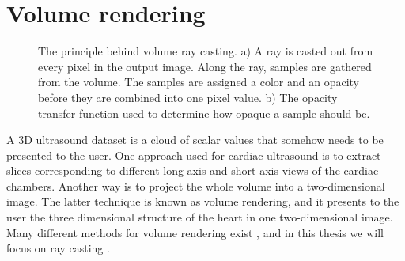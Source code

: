 \section{Volume rendering}\label{sec:volren}
\begin{figure}[t!]
\centering
{}
\caption{The principle behind volume ray casting. a) A ray is casted out from every pixel in the output image. Along the ray, samples are gathered from the volume. The samples are assigned a color and an opacity before they are combined into one pixel value. b) The opacity transfer function used to determine how opaque a sample should be.}
\label{fig:vr}
\end{figure}
A 3D ultrasound dataset is a cloud of scalar values that somehow needs to be presented to the user. One approach used for cardiac ultrasound  is to extract slices corresponding to different long-axis and short-axis views of the cardiac chambers. Another way is to project the whole volume into a two-dimensional image. The latter technique is known as volume rendering, and it presents to the user the three dimensional structure of the heart in one two-dimensional image. Many different methods for volume rendering exist \cite{brodlie2001}, and in this thesis we will focus on ray casting \cite{Levoy1988}. 

